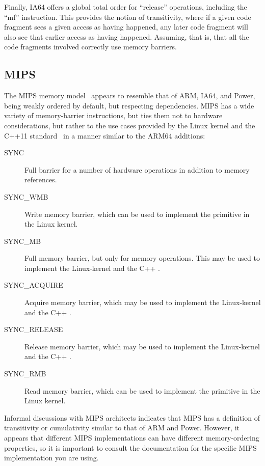 Finally, IA64 offers a global total order for ``release'' operations,
including the ``mf'' instruction.
This provides the notion of transitivity, where if a given code fragment
sees a given access as having happened, any later code fragment will
also see that earlier access as having happened.
Assuming, that is, that all the code fragments involved correctly use
memory barriers.

\subsection{MIPS}

The MIPS memory model~\cite[Table 6.6]{MIPSvII-A-2015}
appears to resemble that of ARM, IA64, and Power,
being weakly ordered by default, but respecting dependencies.
MIPS has a wide variety of memory-barrier instructions, but ties them
not to hardware considerations, but rather to the use cases provided
by the Linux kernel and the C++11 standard~\cite{RichardSmith2015N4527}
in a manner similar to the ARM64 additions:

\begin{description}
\item[SYNC]
	Full barrier for a number of hardware operations in addition
	to memory references.
\item[SYNC\_WMB]
	Write memory barrier, which can be used to implement the
	 primitive in the Linux kernel.
\item[SYNC\_MB]
	Full memory barrier, but only for memory operations.
	This may be used to implement the Linux-kernel 
	and the C++ .
\item[SYNC\_ACQUIRE]
	Acquire memory barrier, which may be used to implement the
	Linux-kernel  and the C++
	.
\item[SYNC\_RELEASE]
	Release memory barrier, which may be used to implement the
	Linux-kernel  and the C++
	.
\item[SYNC\_RMB]
	Read memory barrier, which can be used to implement the
	 primitive in the Linux kernel.
\end{description}

Informal discussions with MIPS architects indicates that MIPS has a
definition of transitivity or cumulativity similar to that of
ARM and Power.
However, it appears that different MIPS implementations can have
different memory-ordering properties, so it is important to consult
the documentation for the specific MIPS implementation you are using.


